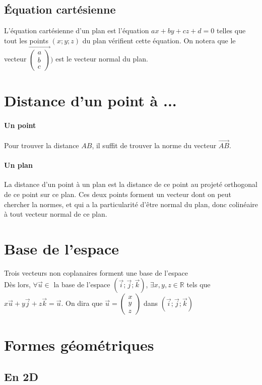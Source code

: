 \documentclass{article}
\begin{document}
\subsection{Équation cartésienne}
L'équation cartésienne d'un plan est l'équation $ax+by+cz+d = 0$ telles que tout les points $(x;y;z)$ du plan vérifient cette équation. On notera que le vecteur $\Vec{\begin{pmatrix}a\\b\\c\end{pmatrix}})$ est le vecteur normal du plan.

\section{Distance d'un point à ...}
\paragraph{Un point}
Pour trouver la distance $AB$, il suffit de trouver la norme du vecteur $\Vec{AB}$.
\paragraph{Un plan}
La distance d'un point à un plan est la distance de ce point au projeté orthogonal de ce point sur ce plan. Ces deux points forment un vecteur dont on peut chercher la normes, et qui a la particularité d'être normal du plan, donc colinéaire à tout vecteur normal de ce plan.


\section{Base de l'espace}
Trois vecteurs non coplanaires forment une base de l'espace\\
Dès lors, $\forall \Vec{u} \in$ la base de l'espace $(\Vec{i};\Vec{j};\Vec{k})$, $\exists x,y,z \in \mathbb{R}$ tels que $x\Vec{u}+y\Vec{j}+z\Vec{k}=\Vec{u}$. On dira que $\Vec{u} = \begin{pmatrix}x\\y\\z\end{pmatrix}$ dans $(\Vec{i};\Vec{j};\Vec{k})$


\section{Formes géométriques}

\subsection{En 2D}
\end{document}
